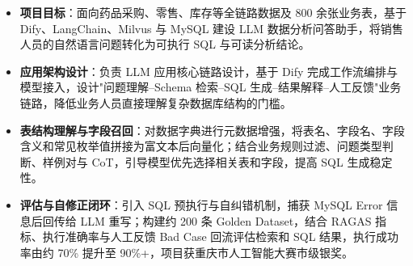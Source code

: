 \documentclass[10pt]{article}
\begin{document}
    \vspace{0.35em}
    \begin{itemize}
        \item \textbf{项目目标}：面向药品采购、零售、库存等全链路数据及 800 余张业务表，基于 Dify、LangChain、Milvus 与 MySQL 建设 LLM 数据分析问答助手，将销售人员的自然语言问题转化为可执行 SQL 与可读分析结论。
        \item \textbf{应用架构设计}：负责 LLM 应用核心链路设计，基于 Dify 完成工作流编排与模型接入，设计"问题理解--Schema 检索--SQL 生成--结果解释--人工反馈"业务链路，降低业务人员直接理解复杂数据库结构的门槛。
        \item \textbf{表结构理解与字段召回}：对数据字典进行元数据增强，将表名、字段名、字段含义和常见枚举值拼接为富文本后向量化；结合业务规则过滤、问题类型判断、样例对与 CoT，引导模型优先选择相关表和字段，提高 SQL 生成稳定性。
        \item \textbf{评估与自修正闭环}：引入 SQL 预执行与自纠错机制，捕获 MySQL Error 信息后回传给 LLM 重写；构建约 200 条 Golden Dataset，结合 RAGAS 指标、执行准确率与人工反馈 Bad Case 回流评估检索和 SQL 结果，执行成功率由约 70\% 提升至 90\%+，项目获重庆市人工智能大赛市级银奖。
    \end{itemize}

    
\end{document}
